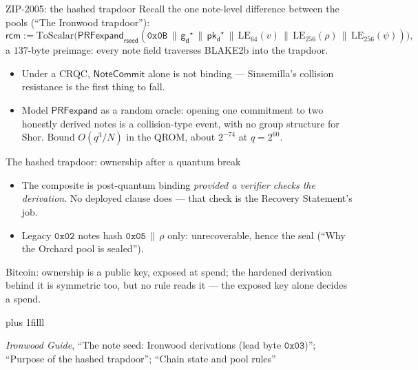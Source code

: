\documentclass[aspectratio=169,11pt]{beamer}
\newcommand{\gd}{\ensuremath{\mathsf{g_d}}}
\newcommand{\pkd}{\ensuremath{\mathsf{pk_d}}}
\newcommand{\rcm}{\ensuremath{\mathsf{rcm}}}
\newcommand{\NoteCommit}{\ensuremath{\mathsf{NoteCommit}}}
\newcommand{\src}[1]{\par\vskip0pt plus 1filll
  {\fontsize{6}{7.2}\selectfont\color{arbdim}\raggedright #1\par}}
\begin{document}
\begin{frame}{ZIP-2005: the hashed trapdoor}
Recall the one note-level difference between the pools (``The Ironwood
trapdoor''):
\[
\rcm := \mathrm{ToScalar}\bigl(\mathsf{PRFexpand}_{\mathsf{rseed}}(
\mathtt{0x0B} \,\|\, \gd^\star \,\|\, \pkd^\star \,\|\, \mathrm{LE}_{64}(v)
\,\|\, \mathrm{LE}_{256}(\rho) \,\|\, \mathrm{LE}_{256}(\psi))\bigr),
\]
a $137$-byte preimage: every note field traverses BLAKE2b into the
trapdoor.
\begin{itemize}
  \item Under a CRQC, \NoteCommit{} alone is not binding --- Sinsemilla's
    collision resistance is the first thing to fall.
  \item Model $\mathsf{PRFexpand}$ as a random oracle: opening one
    commitment to two honestly derived notes is a collision-type event,
    with no group structure for Shor. Bound $O(q^3/N)$ in the QROM, about
    $2^{-74}$ at $q = 2^{60}$.
\end{itemize}
\end{frame}

\begin{frame}{The hashed trapdoor: ownership after a quantum break}
\begin{itemize}
  \item The composite is post-quantum binding \emph{provided a verifier
    checks the derivation}. No deployed clause does --- that check is the
    Recovery Statement's job.
  \item Legacy $\mathtt{0x02}$ notes hash $\mathtt{0x05} \,\|\, \rho$
    only: unrecoverable, hence the seal (``Why the Orchard pool is
    sealed'').
\end{itemize}
\alert{Bitcoin:} ownership is a public key, exposed at spend; the hardened
derivation behind it is symmetric too, but no rule reads it --- the
exposed key alone decides a spend.
\src{\emph{Ironwood Guide}, ``The note seed: Ironwood derivations (lead byte
$\mathtt{0x03}$)''; ``Purpose of the hashed trapdoor''; ``Chain state and pool
rules''}
\end{frame}
\end{document}
